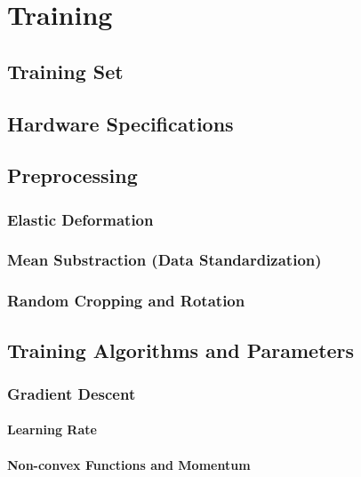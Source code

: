 \chapter{Training}

	\section{Training Set}

	\section{Hardware Specifications}

	\section {Preprocessing}

		\subsection{Elastic Deformation}

		\subsection{Mean Substraction (Data Standardization)}

		\subsection {Random Cropping and Rotation}

	\section {Training Algorithms and Parameters}
	
		\subsection{Gradient Descent}

			\subsubsection{Learning Rate}

			\subsubsection{Non-convex Functions and Momentum}

